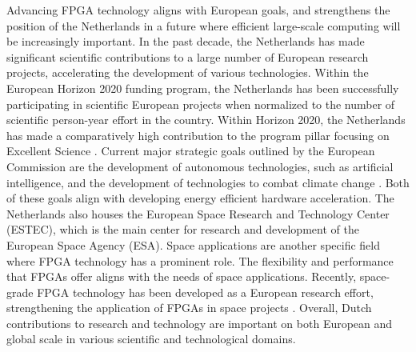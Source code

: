 Advancing FPGA technology aligns with European goals, and strengthens the position of the Netherlands in a future where efficient large-scale computing will be increasingly important. %
In the past decade, the Netherlands has made significant scientific contributions to a large number of European research projects, accelerating the development of various technologies. Within the European Horizon 2020 funding program, the Netherlands has been %
successfully %
participating %
in scientific European projects %
when normalized to the number of scientific person-year effort in the country. Within Horizon 2020, the Netherlands has made a comparatively high contribution to the program pillar focusing on Excellent Science \cite{rathenauNederlandHorizon}. Current major strategic goals outlined by the European Commission are the development of autonomous technologies, such as artificial intelligence, and the development of technologies to combat climate change \cite{rathenauEuropeseWetenschap}. Both of these goals align with developing energy efficient hardware acceleration. The Netherlands also houses the European Space Research and Technology Center (ESTEC), which is the main center for research and development of the European Space Agency (ESA). Space applications are another specific field where FPGA technology has a prominent role. The flexibility and performance that FPGAs offer aligns with the needs of space applications. Recently, space-grade FPGA technology has been developed as a European research effort, strengthening the application of FPGAs in space projects \cite{EuEsaSpaceGradeFpgProject}.  Overall, Dutch contributions to research and technology are important on both European and global scale in various scientific and technological domains.

